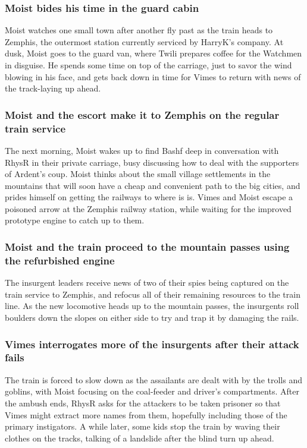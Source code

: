 \subsubsection{\Gls{Moist} bides his time in the guard cabin}
\Gls{Moist} watches one small town after another fly past as the train heads to Zemphis, the
outermost station currently serviced by \Gls{HarryK}'s company. At dusk, \Gls{Moist} goes to the
guard van, where \Gls{Twili} prepares coffee for the Watchmen in disguise. He spends some time
on top of the carriage, just to savor the wind blowing in his face, and gets back down in time for
\Gls{Vimes} to return with news of the track-laying up ahead.

\subsubsection{\Gls{Moist} and the escort make it to Zemphis on the regular train service}
The next morning, \Gls{Moist} wakes up to find \Gls{Bashf} deep in conversation with \Gls{RhysR} in
their private carriage, busy discussing how to deal with the supporters of \Gls{Ardent}'s coup.
\Gls{Moist} thinks about the small village settlements in the mountains that will soon have a
cheap and convenient path to the big cities, and prides himself on getting the railways to where is
is. \Gls{Vimes} and \Gls{Moist} escape a poisoned arrow at the Zemphis railway station, while
waiting for the improved prototype engine to catch up to them.

\subsubsection{\Gls{Moist} and the train proceed to the mountain passes using the refurbished
    engine}
The insurgent leaders receive news of two of their spies being captured on the train service to
Zemphis, and refocus all of their remaining resources to the train line. As the new locomotive
heads up to the mountain passes, the insurgents roll boulders down the slopes on either side to
try and trap it by damaging the rails.

\subsubsection{\Gls{Vimes} interrogates more of the insurgents after their attack fails}
The train is forced to slow down as the assailants are dealt with by the trolls and goblins, with
\Gls{Moist} focusing on the coal-feeder and driver's compartments. After the ambush ends,
\Gls{RhysR} asks for the attackers to be taken prisoner so that \Gls{Vimes} might extract more
names from them, hopefully including those of the primary instigators. A while later, some kids
stop the train by waving their clothes on the tracks, talking of a landslide after the blind turn
up ahead.

